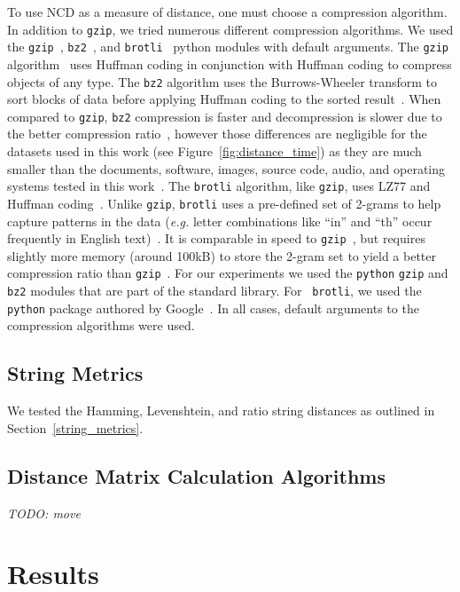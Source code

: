 \documentclass[preprint,12pt]{elsarticle}
\newcommand{\cm}[1]{\textit{{\color{blue}#1}}}
\begin{document}
To use NCD as a measure of distance, one must choose a compression algorithm.
In addition to \texttt{gzip}, we tried numerous different compression algorithms. We used the \texttt{gzip}~\cite{gzip},  \texttt{bz2}~\cite{bz2}, and \texttt{brotli}~\cite{brotli_package} python modules with default arguments.
The \texttt{gzip} algorithm~\cite{deflate,gzip} uses Huffman coding in conjunction with Huffman coding to compress objects of any type.
The \texttt{bz2} algorithm uses the Burrows-Wheeler transform to sort blocks of data before applying Huffman coding to the sorted result~\cite{bz2}.
When compared to \texttt{gzip}, \texttt{bz2} compression is faster and decompression is slower due to the better compression ratio~\cite{bz2_comparison}, however those differences are negligible for the datasets used in this work (see Figure~\ref{fig:distance_time}) as they are much smaller than the documents, software, images, source code, audio, and operating systems tested in this work~\cite{bz2_comparison}.
The \texttt{brotli} algorithm, like \texttt{gzip}, uses LZ77 and Huffman coding~\cite{brotli_comparison}.
Unlike \texttt{gzip}, \texttt{brotli} uses a pre-defined set of 2-grams to help capture patterns in the data (\textit{e.g.} letter combinations like ``in'' and ``th'' occur frequently in English text)~\cite{brotli_comparison}.
It is comparable in speed to \texttt{gzip}~\cite{brotli_comparison}, but requires slightly more memory (around 100kB) to store the 2-gram set to yield a better compression ratio than \texttt{gzip}~\cite{brotli_comparison}.
For our experiments we used the \texttt{python} \texttt{gzip} and  \texttt{bz2} modules that are part of the standard library.
For ~\texttt{brotli}, we used the \texttt{python} package authored by Google~\cite{brotli_package}.
In all cases, default arguments to the compression algorithms were used.


\subsection{String Metrics}
We tested the Hamming, Levenshtein, and ratio string distances as outlined in Section~\ref{string_metrics}.

\subsection{Distance Matrix Calculation Algorithms}
\cm{TODO: move}



\section{Results}
\label{results}
\end{document}
